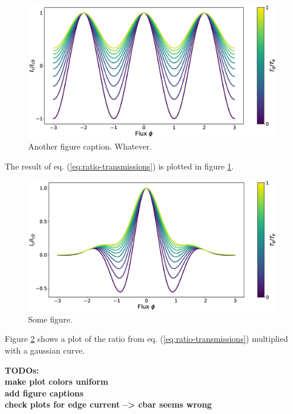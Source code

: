 \begin{figure}
\centering
\includegraphics[width=\textwidth]{figure/analyticalmodel/ratio-transmissions} 
\caption{Another figure caption. Whatever.}\label{fig:ratio-transmissions}
\end{figure}
The result of eq. (\ref{eq:ratio-transmissions}) is plotted in figure \ref{fig:ratio-transmissions}. 
\begin{figure}
\centering
\includegraphics[width=\textwidth]{figure/analyticalmodel/ratio-transmissions-gaussian}
\caption{Some figure.}\label{fig:modulated-pattern}
\end{figure}
Figure \ref{fig:modulated-pattern} shows a plot of the ratio from eq. (\ref{eq:ratio-transmissions}) multiplied with a gaussian curve. 

\textbf{TODOs: \\
make plot colors uniform\\
add figure captions\\
check plots for edge current --> cbar seems wrong}
